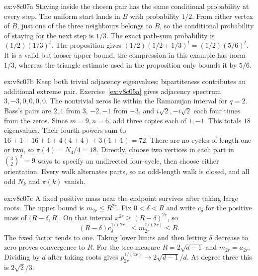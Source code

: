 \begin{solution}{ex:v8c07a}
\idea Staying inside the chosen pair has the same conditional probability at every step.
\writeup The uniform start lands in $B$ with probability $1/2$. From either vertex of $B$, just one of the three neighbours belongs to $B$, so the conditional probability of staying for the next step is $1/3$. The exact path-sum probability is $(1/2)(1/3)^t$. The proposition gives $(1/2)(1/2+1/3)^t=(1/2)(5/6)^t$. It is a valid but looser upper bound; the compression in this example has norm $1/3$, whereas the triangle estimate used in the proposition only bounds it by $5/6$.
\end{solution}

\begin{solution}{ex:v8c07b}
\idea Keep both trivial adjacency eigenvalues; bipartiteness contributes an additional extreme pair.
\writeup Exercise~\ref{ex:v8c05a} gives adjacency spectrum $3,-3,0,0,0,0$. The nontrivial zeros lie within the Ramanujan interval for $q=2$. Bass's pairs are $2,1$ from $3$, $-2,-1$ from $-3$, and $i\sqrt2,-i\sqrt2$ each four times from the zeros. Since $m=9,n=6$, add three copies each of $1,-1$. This totals $18$ eigenvalues.
Their fourth powers sum to
$16+1+16+1+4(4+4)+3(1+1)=72$.
There are no cycles of length one or two, so $\pi(4)=N_4/4=18$. Directly, choose two vertices in each part in $\binom32^2=9$ ways to specify an undirected four-cycle, then choose either orientation. Every walk alternates parts, so no odd-length walk is closed, and all odd $N_k$ and $\pi(k)$ vanish.
\end{solution}

\begin{solution}{ex:v8c07c}
\idea A fixed positive mass near the endpoint survives after taking large roots.
\writeup The upper bound is $m_{2r}\le R^{2r}$. Fix $0<\delta<R$ and write $c_\delta$ for the positive mass of $(R-\delta,R]$. On that interval $x^{2r}\ge(R-\delta)^{2r}$, so
\[
(R-\delta)c_\delta^{1/(2r)}\le m_{2r}^{1/(2r)}\le R.
\]
The fixed factor tends to one. Taking lower limits and then letting $\delta$ decrease to zero proves convergence to $R$.
For the tree measure $R=2\sqrt{d-1}$ and $m_{2r}=a_{2r}$. Dividing by $d$ after taking roots gives $p_{2r}^{1/(2r)}\to2\sqrt{d-1}/d$. At degree three this is $2\sqrt2/3$.
\end{solution}

